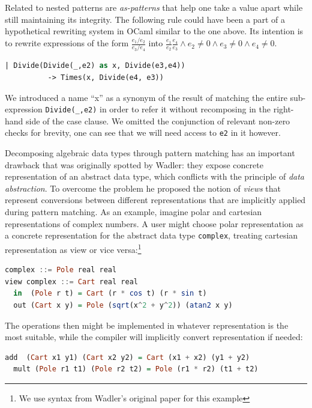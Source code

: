 \documentclass[preprint]{sigplanconf}
\DeclareRobustCommand{\codeocaml}[1]{{\lstinline[breaklines=false,language=Caml]{#1}}}
\begin{document}
Related to nested patterns are \emph{as-patterns} that help one take a value 
apart while still maintaining its integrity. The following rule could have been 
a part of a hypothetical rewriting system in OCaml similar to the one above. Its 
intention is to rewrite expressions of the form $\frac{e_1/e_2}{e_3/e_4}$ into 
$\frac{e_1}{e_2}\frac{e_4}{e_3} \wedge e_2\neq0 \wedge e_3\neq0 \wedge e_4\neq0$.

\begin{lstlisting}[language=Caml]
    | Divide(Divide(_,e2) as x, Divide(e3,e4))
          -> Times(x, Divide(e4, e3))
\end{lstlisting}

\noindent
We introduced a name ``x'' as a synonym of the result of matching the 
entire sub-expression \codeocaml{Divide(_,e2)} in order to refer it without 
recomposing in the right-hand side of the case clause. We omitted the 
conjunction of relevant non-zero checks for brevity, one can see that we will 
need access to \codeocaml{e2} in it however.

Decomposing algebraic data types through pattern matching has an important 
drawback that was originally spotted by Wadler\cite{Wadler87}: they expose 
concrete representation of an abstract data type, which conflicts with the 
principle of \emph{data abstraction}. To overcome the problem he proposed the 
notion of \emph{views} that represent conversions between different 
representations that are implicitly applied during pattern matching. As an 
example, imagine polar and cartesian representations of complex numbers. A user 
might choose polar representation as a concrete representation for the abstract 
data type \codeocaml{complex}, treating cartesian representation as view or vice 
versa:\footnote{We use syntax from Wadler's original paper for this example}

\begin{lstlisting}[language=Haskell,columns=flexible]
complex ::= Pole real real
view complex ::= Cart real real
  in  (Pole r t) = Cart (r * cos t) (r * sin t)
  out (Cart x y) = Pole (sqrt(x^2 + y^2)) (atan2 x y)
\end{lstlisting}

\noindent
The operations then might be implemented in whatever representation is the most 
suitable, while the compiler will implicitly convert representation if needed:

\begin{lstlisting}[language=Haskell,columns=flexible]
  add  (Cart x1 y1) (Cart x2 y2) = Cart (x1 + x2) (y1 + y2)
  mult (Pole r1 t1) (Pole r2 t2) = Pole (r1 * r2) (t1 + t2)
\end{lstlisting}
\end{document}
